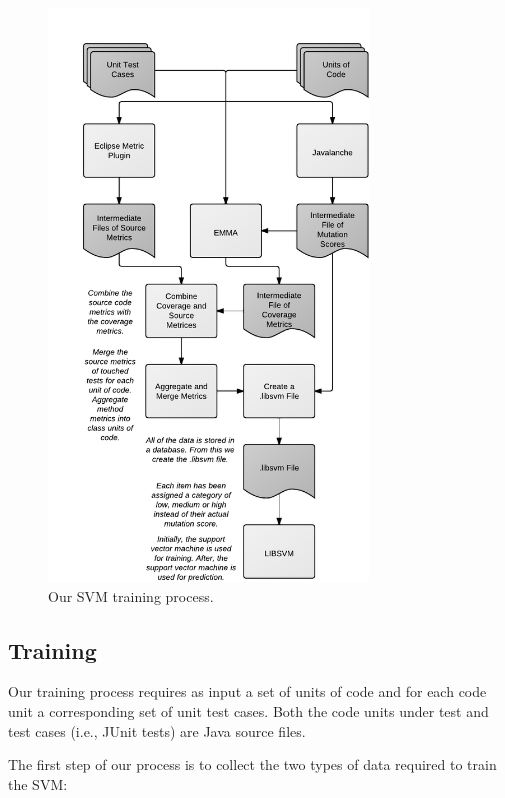 \documentclass[10pt,conference,compsocconf]{IEEEtran}
\begin{document}
\begin{figure}[!t]
  \centering
  \includegraphics[width=8.5cm]{figures/process.pdf}
  \caption{Our SVM training process.}
  \label{fig:process}
\end{figure}


\subsection{Training}
\label{subsec:training}
Our training process requires as input a set of units of code and for each code unit a corresponding set of unit test cases. Both the code units under test and test cases (i.e., JUnit tests) are Java source files.

The first step of our process is to collect the two types of data required to train the SVM:
\end{document}
